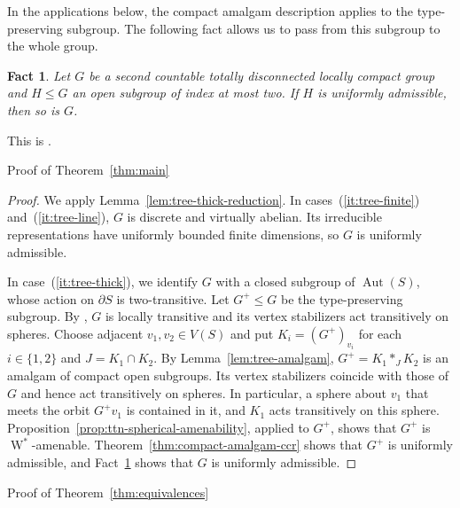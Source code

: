 \documentclass[11pt]{amsart}
\makeatletter
\numberwithin{equation}{section}
\def\subsection{\@startsection{subsection}{2}%
  \z@{.7\linespacing\@plus.7\linespacing}{.3\linespacing}%
  {\normalfont\bfseries}}
\DeclareMathOperator{\Aut}{Aut}
\newcommand{\Wstar}{\operatorname{W}^*}
\newtheorem{fact}[The]{Fact}
\theoremstyle{definition}
\makeatother
\begin{document}
In the applications below, the compact amalgam description applies to the type-preserving subgroup. The following fact allows us to pass from this subgroup to the whole group.

\begin{fact}
    \label{fact:uniform-finite-extension}
    Let $G$ be a second countable totally disconnected locally compact group and $H\leq G$ an open subgroup of index at most two. If $H$ is uniformly admissible, then so is $G$.
\end{fact}

This is \cite[Lemma~A.8]{Semal24}.


\subsection{Proof of Theorem~\ref{thm:main}}
\label{subsec:main-proofs}

\begin{proof}
    We apply Lemma~\ref{lem:tree-thick-reduction}. In cases~\textup{(\ref*{it:tree-finite})} and~\textup{(\ref*{it:tree-line})}, $G$ is discrete and virtually abelian. Its irreducible representations have uniformly bounded finite dimensions, so $G$ is uniformly admissible.

    In case~\textup{(\ref*{it:tree-thick})}, we identify $G$ with a closed subgroup of $\Aut(S)$, whose action on $\partial S$ is two-transitive. Let $G^+\leq G$ be the type-preserving subgroup. By \cite[Lemma~3.1.1]{BM00}, $G$ is locally transitive and its vertex stabilizers act transitively on spheres. Choose adjacent $v_1,v_2\in V(S)$ and put $K_i=(G^+)_{v_i}$ for each $i\in\{1,2\}$ and $J=K_1\cap K_2$. By Lemma~\ref{lem:tree-amalgam}, $G^+=K_1\ast_JK_2$ is an amalgam of compact open subgroups. Its vertex stabilizers coincide with those of $G$ and hence act transitively on spheres. In particular, a sphere about $v_1$ that meets the orbit $G^+v_1$ is contained in it, and $K_1$ acts transitively on this sphere. Proposition~\ref{prop:ttn-spherical-amenability}, applied to $G^+$, shows that $G^+$ is $\Wstar$-amenable. Theorem~\ref{thm:compact-amalgam-ccr} shows that $G^+$ is uniformly admissible, and Fact~\ref{fact:uniform-finite-extension} shows that $G$ is uniformly admissible.
\end{proof}

\subsection{Proof of Theorem~\ref{thm:equivalences}}
\label{subsec:equivalences-proof}
\end{document}
